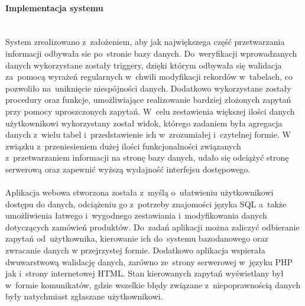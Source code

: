 \documentclass[a4paper, 12pt]{article}
\begin{document}
\paragraph{Implementacja systemu} \mbox{}\\
System zrealizowano z~założeniem, aby jak największega część przetwarzania informacji odbywała sie po~stronie bazy danych. Do~weryfikacji wprowadzanych danych wykorzystane zostały triggery, dzięki którym odbywała się walidacja za~pomocą wyrażeń regularnych w~chwili modyfikacji rekordów w~tabelach, co pozwoliło na~uniknięcie niespójności danych. Dodatkowo wykorzystane zostały procedury oraz funkcje, umożliwiające realizowanie bardziej złożonych zapytań przy pomocy uproszczonych zapytań. W~celu zestawienia większej ilości danych użytkownikowi wykorzystany został widok, którego zadaniem była agregacja danych z~wielu tabel i~przedstawienie ich w~zrozumiałej i~czytelnej formie. W związku z~przeniesieniem dużej ilości funkcjonalności związanych z~przetwarzaniem informacji na stronę bazy danych, udało się odciążyć stronę serwerową oraz zapewnić wyższą wydajność interfejsu dostępowego.\\\\
Aplikacja webowa stworzona została z~myślą o~ułatwieniu użytkownikowi dostępu do danych, odciążeniu go z~potrzeby znajomości języka SQL a~także umożliwienia łatwego i~wygodnego zestawiania i~modyfikowania danych dotyczących zamówień produktów. Do~zadań aplikacji można zaliczyć odbieranie zapytań od~użytkownika, kierowanie ich do~systemu bazodanowego oraz zwracanie danych w przejrzystej formie. Dodatkowo aplikacja wspierała dwuwarstwową walidację danych, zarówno ze~strony serwerowej w~języku PHP jak i~strony internetowej HTML. Stan kierowanych zapytań wyświetlany był w~formie komunikatów, gdzie wszelkie błędy związane z~niepoprawnością danych były natychmiast zgłaszane użytkownikowi.
\end{document}
